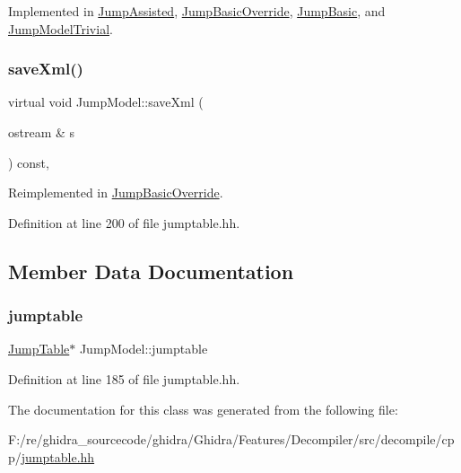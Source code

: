 Implemented in \mbox{\hyperlink{class_jump_assisted_acda2c7e13c4b78b8c229e63fad03374b}{Jump\+Assisted}}, \mbox{\hyperlink{class_jump_basic_override_a050d3faa295ff61d04f1406443ac83b1}{Jump\+Basic\+Override}}, \mbox{\hyperlink{class_jump_basic_a1cba6b6c963e4a70efc439c27e53bd44}{Jump\+Basic}}, and \mbox{\hyperlink{class_jump_model_trivial_a68d3e47c3ec7554f8a7d6800017d2ead}{Jump\+Model\+Trivial}}.

\mbox{\label{class_jump_model_a014148fe25655a7399bce14af4ae1ed8}} 
\subsubsection{\texorpdfstring{saveXml()}{saveXml()}}
{\footnotesize\ttfamily virtual void Jump\+Model\+::save\+Xml (\begin{DoxyParamCaption}\item[{ostream \&}]{s }\end{DoxyParamCaption}) const\hspace{0.3cm}{\ttfamily [inline]}, {\ttfamily [virtual]}}



Reimplemented in \mbox{\hyperlink{class_jump_basic_override_a62070a61c5ab32dbc287c7b32e74bd64}{Jump\+Basic\+Override}}.



Definition at line 200 of file jumptable.\+hh.



\subsection{Member Data Documentation}
\mbox{\label{class_jump_model_a3254101eed73a4e245587679682b510d}} 
\subsubsection{\texorpdfstring{jumptable}{jumptable}}
{\footnotesize\ttfamily \mbox{\hyperlink{class_jump_table}{Jump\+Table}}$\ast$ Jump\+Model\+::jumptable\hspace{0.3cm}{\ttfamily [protected]}}



Definition at line 185 of file jumptable.\+hh.



The documentation for this class was generated from the following file\+:\begin{DoxyCompactItemize}
\item 
F\+:/re/ghidra\+\_\+sourcecode/ghidra/\+Ghidra/\+Features/\+Decompiler/src/decompile/cpp/\mbox{\hyperlink{jumptable_8hh}{jumptable.\+hh}}\end{DoxyCompactItemize}
